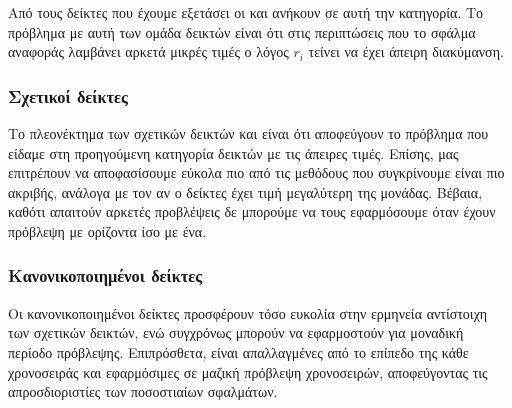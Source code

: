 Από τους δείκτες που έχουμε εξετάσει οι  και  ανήκουν σε αυτή την κατηγορία. Το πρόβλημα με αυτή των ομάδα δεικτών είναι ότι στις περιπτώσεις που το σφάλμα αναφοράς λαμβάνει αρκετά μικρές τιμές ο λόγος $r_i$ τείνει να έχει άπειρη διακύμανση.

\subsubsection{Σχετικοί δείκτες}

Το πλεονέκτημα των σχετικών δεικτών  και  είναι ότι αποφεύγουν το πρόβλημα που είδαμε στη προηγούμενη κατηγορία δεικτών με τις άπειρες τιμές. Επίσης, μας επιτρέπουν να αποφασίσουμε εύκολα πιο από τις μεθόδους που συγκρίνουμε είναι πιο ακριβής, ανάλογα με τον αν ο δείκτες έχει τιμή μεγαλύτερη της μονάδας. Βέβαια, καθότι απαιτούν αρκετές προβλέψεις δε μπορούμε να τους εφαρμόσουμε όταν έχουν πρόβλεψη με ορίζοντα ίσο με ένα. 

\subsubsection{Κανονικοποιημένοι δείκτες}

Οι κανονικοποιημένοι δείκτες  προσφέρουν τόσο ευκολία στην ερμηνεία αντίστοιχη των σχετικών δεικτών, ενώ συγχρόνως μπορούν να εφαρμοστούν για μοναδική περίοδο πρόβλεψης. Επιπρόσθετα, είναι απαλλαγμένες από το επίπεδο της κάθε χρονοσειράς και εφαρμόσιμες σε μαζική πρόβλεψη χρονοσειρών, αποφεύγοντας τις απροσδιοριστίες των ποσοστιαίων σφαλμάτων.





